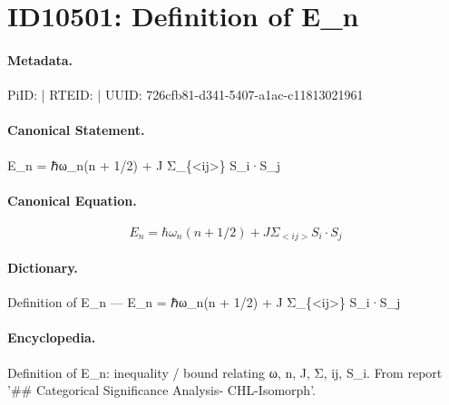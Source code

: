 \section*{ID10501: Definition of E\_n}
\paragraph{Metadata.}
PiID:  | RTEID:  | UUID: 726cfb81-d341-5407-a1ac-c11813021961

\paragraph{Canonical Statement.}
E\_n = ℏω\_n(n + 1/2) + J Σ\_\{<ij>\} S\_i·S\_j

\paragraph{Canonical Equation.}
\[
E_n = ℏω_n(n + 1/2) + J Σ_{<ij>} S_i·S_j
\]

\paragraph{Dictionary.}
Definition of E\_n — E\_n = ℏω\_n(n + 1/2) + J Σ\_\{<ij>\} S\_i·S\_j

\paragraph{Encyclopedia.}
Definition of E\_n: inequality / bound relating ω, n, J, Σ, ij, S\_i. From report '\#\# Categorical Significance Analysis- CHL-Isomorph'.
